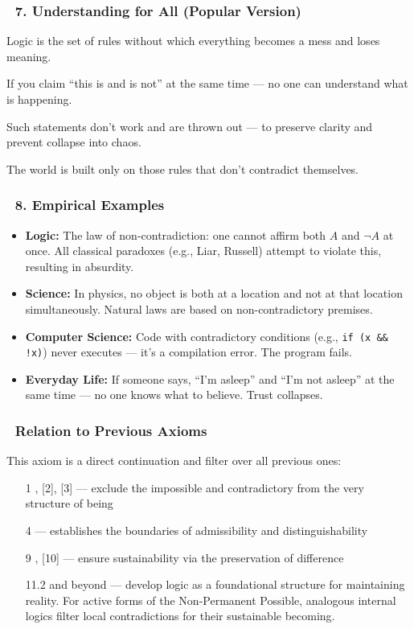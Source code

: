\documentclass[12pt]{article}
\begin{document}
\subsubsection*{🔹 7. Understanding for All (Popular Version)}

Logic is the set of rules without which everything becomes a mess and loses meaning.

If you claim ``this is and is not'' at the same time — no one can understand what is happening.

Such statements don’t work and are thrown out — to preserve clarity and prevent collapse into chaos.

The world is built only on those rules that don’t contradict themselves.

\subsubsection*{🔹 8. Empirical Examples}

\begin{itemize}
\item \textbf{Logic:} The law of non-contradiction: one cannot affirm both $A$ and $¬A$ at once. All classical paradoxes (e.g., Liar, Russell) attempt to violate this, resulting in absurdity.
\item \textbf{Science:} In physics, no object is both at a location and not at that location simultaneously. Natural laws are based on non-contradictory premises.
\item \textbf{Computer Science:} Code with contradictory conditions (e.g., \texttt{if (x \&\& !x)}) never executes — it's a compilation error. The program fails.
\item \textbf{Everyday Life:} If someone says, ``I'm asleep'' and ``I'm not asleep'' at the same time — no one knows what to believe. Trust collapses.
\end{itemize}

\subsubsection*{🔹 Relation to Previous Axioms}

This axiom is a direct continuation and filter over all previous ones:

\begin{itemize}
\item [1], [2], [3] — exclude the impossible and contradictory from the very structure of being
\item [4] — establishes the boundaries of admissibility and distinguishability
\item [9], [10] — ensure sustainability via the preservation of difference
\item [11.2] and beyond — develop logic as a foundational structure for maintaining reality. For active forms of the Non-Permanent Possible, analogous internal logics filter local contradictions for their sustainable becoming.
\end{itemize}
\end{document}
